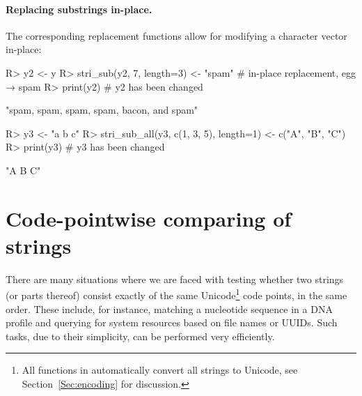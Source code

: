 \documentclass[nojss]{jss}
\begin{document}
\paragraph{Replacing substrings in-place.}
The corresponding {replacement functions} allow for modifying
a character vector in-place:

\begin{Schunk}
\begin{Sinput}
R> y2 <- y
R> stri_sub(y2, 7, length=3) <- "spam"  # in-place replacement, egg → spam
R> print(y2)                            # y2 has been changed
\end{Sinput}
\begin{Soutput}
[1] "spam, spam, spam, spam, bacon, and spam"
\end{Soutput}
\end{Schunk}

\begin{Schunk}
\begin{Sinput}
R> y3 <- "a b c"
R> stri_sub_all(y3, c(1, 3, 5), length=1) <- c("A", "B", "C")
R> print(y3)                            # y3 has been changed
\end{Sinput}
\begin{Soutput}
[1] "A B C"
\end{Soutput}
\end{Schunk}



\clearpage



\section{Code-pointwise comparing of strings}\label{Sec:fixed}

There are many situations where we are faced with testing whether two strings
(or parts thereof)
consist exactly of the same Unicode\footnote{All functions in 
automatically convert all  strings
to Unicode, see Section~\ref{Sec:encoding} for discussion.} code points, in the same order.
These include, for instance, matching a nucleotide sequence
in a DNA profile and querying for system resources based on file names or UUIDs.
Such tasks, due to their simplicity, can be performed very efficiently.
\end{document}
